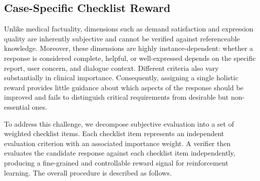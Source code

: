 \documentclass[letterpaper]{article} %
\begin{document}
\subsection{Case-Specific Checklist Reward}
\label{case_specific_check}
Unlike medical factuality, dimensions such as demand satisfaction and expression quality are inherently subjective and cannot be verified against referenceable knowledge. 
Moreover, these dimensions are highly instance-dependent: 
whether a response is considered complete, helpful, or well-expressed depends on the specific report, user concern, and dialogue context. 
Different criteria also vary substantially in clinical importance. Consequently, assigning a single holistic reward provides little guidance about which aspects of the response should be improved and fails to distinguish critical requirements from desirable but non-essential ones.

To address this challenge, we decompose subjective evaluation into a set of weighted checklist items. Each checklist item represents an independent evaluation criterion with an associated importance weight. A verifier then evaluates the candidate response against each checklist item independently, producing a fine-grained and controllable reward signal for reinforcement learning. The overall procedure is described as follows.


\end{document}
